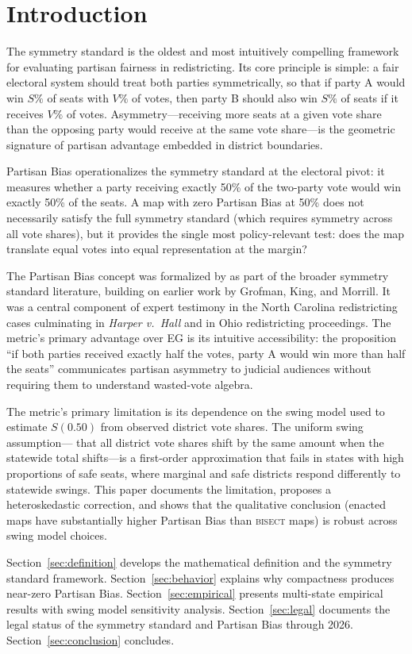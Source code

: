 \section{Introduction}
\label{sec:introduction}

The symmetry standard is the oldest and most intuitively compelling framework
for evaluating partisan fairness in redistricting. Its core principle is simple:
a fair electoral system should treat both parties symmetrically, so that if party
A would win $S\%$ of seats with $V\%$ of votes, then party B should also win $S\%$
of seats if it receives $V\%$ of votes. Asymmetry---receiving more seats at a given
vote share than the opposing party would receive at the same vote share---is the
geometric signature of partisan advantage embedded in district boundaries.

Partisan Bias operationalizes the symmetry standard at the electoral pivot: it
measures whether a party receiving exactly 50\% of the two-party vote would win
exactly 50\% of the seats. A map with zero Partisan Bias at 50\% does not
necessarily satisfy the full symmetry standard (which requires symmetry across
all vote shares), but it provides the single most policy-relevant test: does the
map translate equal votes into equal representation at the margin?

The Partisan Bias concept was formalized by \citet{gelmanKing1994} as part of
the broader symmetry standard literature, building on earlier work by Grofman,
King, and Morrill. It was a central component of expert testimony in the North
Carolina redistricting cases culminating in \textit{Harper v.\ Hall} and in Ohio
redistricting proceedings. The metric's primary advantage over EG is its intuitive
accessibility: the proposition ``if both parties received exactly half the votes,
party A would win more than half the seats'' communicates partisan asymmetry to
judicial audiences without requiring them to understand wasted-vote algebra.

The metric's primary limitation is its dependence on the swing model used to
estimate $S(0.50)$ from observed district vote shares. The uniform swing assumption---
that all district vote shares shift by the same amount when the statewide total
shifts---is a first-order approximation that fails in states with high proportions
of safe seats, where marginal and safe districts respond differently to statewide
swings. This paper documents the limitation, proposes a heteroskedastic correction,
and shows that the qualitative conclusion (enacted maps have substantially higher
Partisan Bias than \textsc{bisect} maps) is robust across swing model choices.

Section~\ref{sec:definition} develops the mathematical definition and the
symmetry standard framework. Section~\ref{sec:behavior} explains why compactness
produces near-zero Partisan Bias. Section~\ref{sec:empirical} presents multi-state
empirical results with swing model sensitivity analysis. Section~\ref{sec:legal}
documents the legal status of the symmetry standard and Partisan Bias through
2026. Section~\ref{sec:conclusion} concludes.
